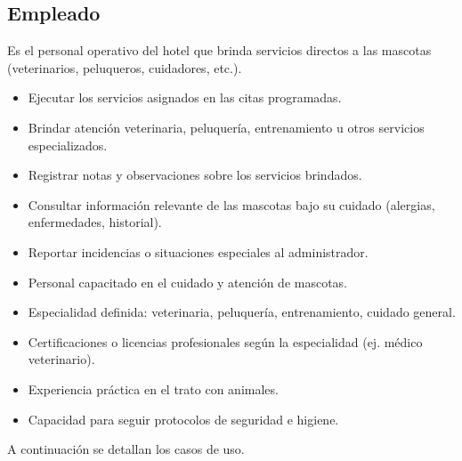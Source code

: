 \begin{Usuario}{\hypertarget{Empleado}{\subsection{Empleado}}}{
	Es el personal operativo del hotel que brinda servicios directos a las mascotas (veterinarios, peluqueros, cuidadores, etc.).
}
    \item[Responsabilidades:] \cdtEmpty
    \begin{itemize}
		\item Ejecutar los servicios asignados en las citas programadas.
		\item Brindar atención veterinaria, peluquería, entrenamiento u otros servicios especializados.
		\item Registrar notas y observaciones sobre los servicios brindados.
		\item Consultar información relevante de las mascotas bajo su cuidado (alergias, enfermedades, historial).
		\item Reportar incidencias o situaciones especiales al administrador.
    \end{itemize}

	\item[Perfil:] \cdtEmpty
    \begin{itemize}
		\item Personal capacitado en el cuidado y atención de mascotas.
		\item Especialidad definida: veterinaria, peluquería, entrenamiento, cuidado general.
		\item Certificaciones o licencias profesionales según la especialidad (ej. médico veterinario).
		\item Experiencia práctica en el trato con animales.
		\item Capacidad para seguir protocolos de seguridad e higiene.
    \end{itemize}
\end{Usuario}

A continuación se detallan los casos de uso.






























